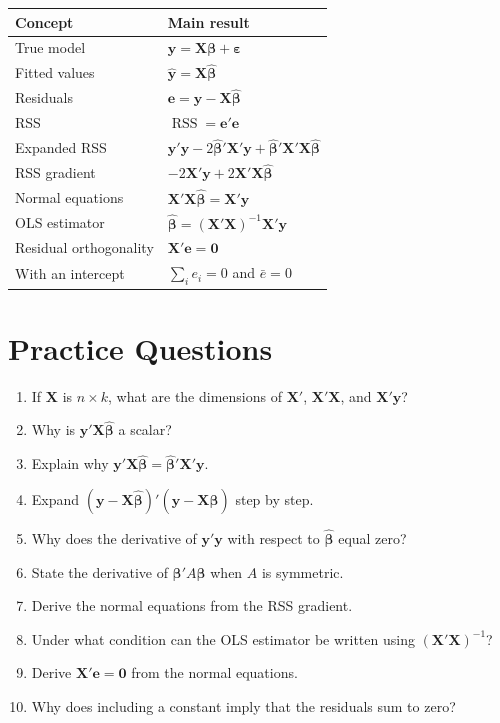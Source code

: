 \documentclass[11pt]{article}
\newcommand{\bhat}{\hat{\boldsymbol{\beta}}}
\newcommand{\eps}{\boldsymbol{\varepsilon}}
\newcommand{\ee}{\mathbf{e}}
\newcommand{\XX}{\mathbf{X}}
\newcommand{\yy}{\mathbf{y}}
\newcommand{\RSS}{\operatorname{RSS}}
\begin{document}
\begin{center}
\begin{tabular}{p{}p{}}
\toprule
\textbf{Concept} & \textbf{Main result}\\
\midrule
True model & $\yy=\XX\boldsymbol{\beta}+\eps$\\
Fitted values & $\widehat{\yy}=\XX\bhat$\\
Residuals & $\ee=\yy-\XX\bhat$\\
RSS & $\RSS=\ee'\ee$\\
Expanded RSS & $\yy'\yy-2\bhat'\XX'\yy+\bhat'\XX'\XX\bhat$\\
RSS gradient & $-2\XX'\yy+2\XX'\XX\bhat$\\
Normal equations & $\XX'\XX\bhat=\XX'\yy$\\
OLS estimator & $\bhat=(\XX'\XX)^{-1}\XX'\yy$\\
Residual orthogonality & $\XX'\ee=\mathbf{0}$\\
With an intercept & $\sum_i e_i=0$ and $\bar e=0$\\
\bottomrule
\end{tabular}
\end{center}

\section{Practice Questions}

\begin{enumerate}
    \item If $\XX$ is $n\times k$, what are the dimensions of $\XX'$, $\XX'\XX$, and $\XX'\yy$?
    \item Why is $\yy'\XX\bhat$ a scalar?
    \item Explain why $\yy'\XX\bhat=\bhat'\XX'\yy$.
    \item Expand $(\yy-\XX\bhat)'(\yy-\XX\bhat)$ step by step.
    \item Why does the derivative of $\yy'\yy$ with respect to $\bhat$ equal zero?
    \item State the derivative of $\boldsymbol{\beta}'A\boldsymbol{\beta}$ when $A$ is symmetric.
    \item Derive the normal equations from the RSS gradient.
    \item Under what condition can the OLS estimator be written using $(\XX'\XX)^{-1}$?
    \item Derive $\XX'\ee=\mathbf{0}$ from the normal equations.
    \item Why does including a constant imply that the residuals sum to zero?
\end{enumerate}
\end{document}
